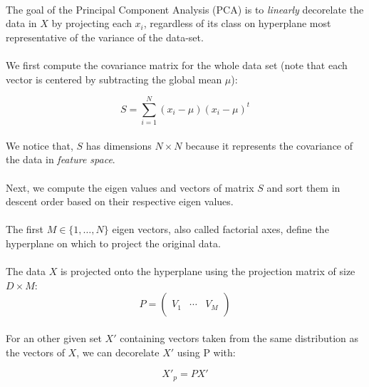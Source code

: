 
\paragraph{}
The goal of the Principal Component Analysis (PCA) is to \emph{linearly} decorelate the data in $X$ by projecting each $x_i$, regardless of its class on hyperplane most representative of the variance of the data-set.

\paragraph{}
We first compute the covariance matrix for the whole data set (note that each vector is centered by subtracting the global mean $\mu$):

$$ S = \sum_{i = 1}^N (x_i - \mu)(x_i - \mu)^t $$

\paragraph{}
We notice that, $S$ has dimensions $N \times N$ because it represents the covariance of the data in \emph{feature space}.

\paragraph{}
Next, we compute the eigen values and vectors of matrix $S$ and sort them in descent order based on their respective eigen values.

\paragraph{}
The first $M \in \{1, \ldots, N\}$ eigen vectors, also called factorial axes, define the hyperplane on which to project the original data.

\paragraph{}
The data $X$ is projected onto the hyperplane using the projection matrix of size $D \times M$:
$$ P = \left( \begin{array}{ccc}
 &  &  \\
V_1 & \cdots & V_M \\
 &  &  \end{array} \right) $$ 

\paragraph{}
For an other given set $X'$ containing vectors taken from the same distribution as the vectors of $X$, we can decorelate $X'$ using P with:

$$ X'_p = PX'$$
